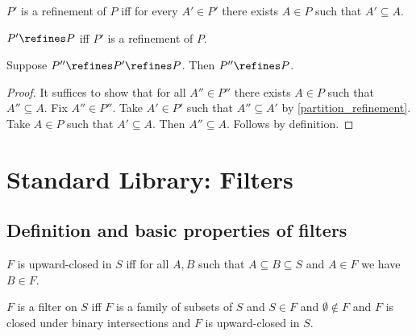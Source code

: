 \begin{definition}\label{partition_refinement}
    $P'$ is a refinement of $P$ iff
    for every $A'\in P'$ there exists
    $A\in P$ such that $A'\subseteq A$.
\end{definition}

\begin{abbreviation}\label{partition_refines}
    $P'\refines P$ iff
    $P'$ is a refinement of $P$.
\end{abbreviation}

\begin{proposition}\label{partition_refinement_transitive}
    Suppose $P''\refines P'\refines P$.
    Then $P''\refines P$.
\end{proposition}
\begin{proof}
    It suffices to show that for all $A''\in P''$ there exists $A\in P$ such that $A''\subseteq A$.
    Fix $A''\in P''$.
    Take $A'\in P'$ such that $A''\subseteq A'$
        by \cref{partition_refinement}.
    Take $A\in P$ such that $A'\subseteq A$.
    Then $A''\subseteq A$.
    Follows by definition. %
\end{proof}

\section{Standard Library: Filters}

\subsection{Definition and basic properties of filters}

\begin{abbreviation}\label{upwardclosed}
    $F$ is upward-closed in $S$ iff
    for all $A, B$ such that $A\subseteq B\subseteq S$ and $A\in F$ we have $B\in F$.
\end{abbreviation}

\begin{definition}\label{filter}
    $F$ is a filter on $S$ iff
    $F$ is a family of subsets of $S$
    and $S\in F$
    and $\emptyset\notin F$
    and $F$ is closed under binary intersections
    and $F$ is upward-closed in $S$.
\end{definition}

